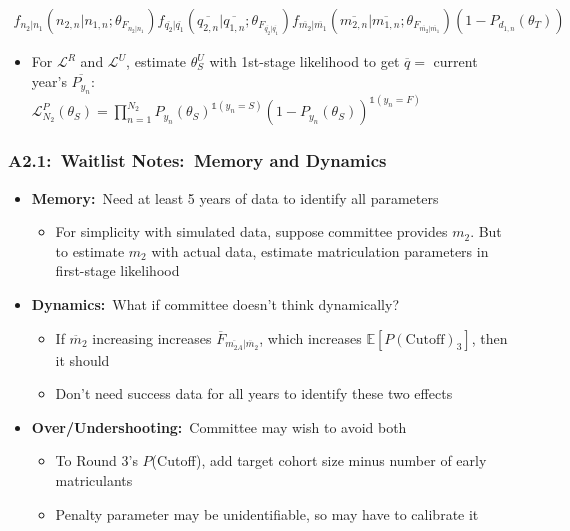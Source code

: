 \documentclass[12pt, aspectratio=169]{beamer}
\begin{document}
\begin{frame}[label=fwdl]
\begin{multline*}
f_{n_2|n_1}(n_{2,n}|n_{1,n};\theta_{F_{n_2|n_1}})f_{\overline{q_2}|\overline{q_1}}(\overline{q_{2,n}}|\overline{q_{1,n}};\theta_{F_{\overline{q_2}|\overline{q_1}}})f_{\overline{m_2}|\overline{m_1}}(\overline{m_{2,n}}|\overline{m_{1,n}};\theta_{F_{\overline{m_2}|\overline{m_1}}})(1-P_{d_{1,n}}(\theta_T))
\end{multline*}
\vspace{-10pt}
\small
\begin{itemize}
\item For $\mathcal{L}^R$ and $\mathcal{L}^U$, estimate $\theta_S^U$ with 1st-stage likelihood to get $\overline{q}=$ current year's $\overline{P_{y_n}}$: \\
$\mathcal{L}_{N_2}^P(\theta_S) = \prod_{n=1}^{N_2}P_{y_n}(\theta_S)^{\mathds{1}(y_n=S)}(1-P_{y_n}(\theta_S))^{\mathds{1}(y_n=F)}$
\end{itemize}
\hyperlink{mle}{}
\end{frame}

\begin{frame}[label=wn]
\frametitle{A2.1:\ Waitlist Notes:\ Memory and Dynamics}
\begin{itemize}
\item \textbf{Memory:}\ Need at least 5 years of data to identify all parameters
\vspace{5pt}
\begin{itemize}
\item For simplicity with simulated data, suppose committee provides $m_2$. But to estimate $m_2$ with actual data, estimate matriculation parameters in first-stage likelihood
\vspace{10pt}
\end{itemize}
\item \textbf{Dynamics:}\ What if committee doesn't think dynamically?
\vspace{5pt}
\begin{itemize}
\item If $\ddot{m_2}$ increasing increases $\overline{F}_{\overline{m_{2A}}|\ddot{m_2}}$, which increases $\mathbb{E}[P(\text{Cutoff})_3]$, then it should
\vspace{5pt}
\item Don't need success data for all years to identify these two effects
\vspace{10pt}
\end{itemize}
\item \textbf{Over/Undershooting:}\ Committee may wish to avoid both
\vspace{5pt}
\begin{itemize}
\item To Round 3's $P$(Cutoff), add target cohort size minus number of early matriculants
\vspace{5pt}
\item Penalty parameter may be unidentifiable, so may have to calibrate it
\vspace{10pt}
\end{itemize}
\end{itemize}
\hyperlink{wme}{}
\end{frame}
\end{document}

